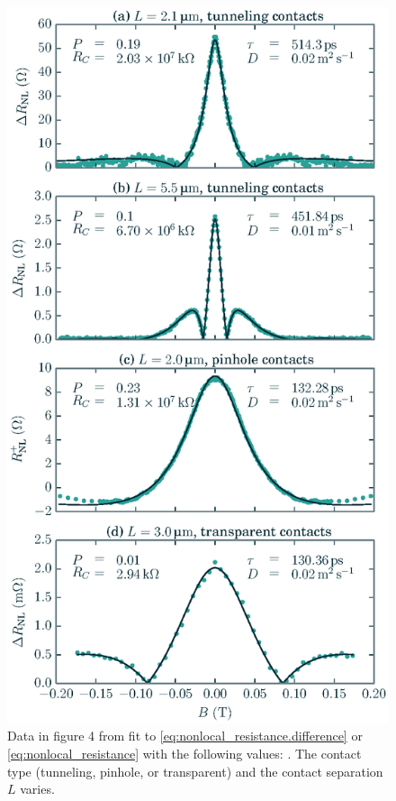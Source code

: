 \begin{figure}
\label{fig:nonlocal_resistance.fits}
  \centering
  \includegraphics[width=\textwidth]{figures/plot_fits}
  \caption{
    Data in figure 4 from
    \cite{PhysRevLett.105.167202}
    fit to \cref{eq:nonlocal_resistance.difference}
    or \cref{eq:nonlocal_resistance}
    with the following values: \plotFitsInfo.
    The contact type (tunneling, pinhole, or transparent)
    and the contact separation $L$ varies.
  }
\end{figure}

